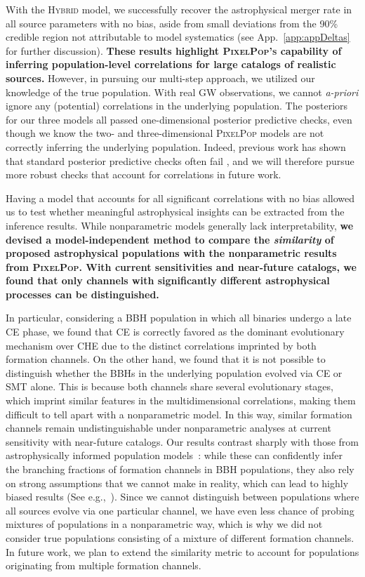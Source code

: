 \documentclass[twocolumn, twocolappendix]{aastex631}
\newcommand{\PixelPop}{\textsc{PixelPop}\xspace}
\newcommand{\Hybrid}{\textsc{Hybrid}\xspace}
\begin{document}
With the \Hybrid model, we successfully recover the astrophysical merger rate in all source parameters with no bias, aside from small deviations from the 90\% credible region not attributable to model systematics (see App.~\ref{app:appDeltas} for further discussion). \textbf{These results highlight \textsc{PixelPop's} capability of inferring population-level correlations for large catalogs of realistic sources.} However, in pursuing our multi-step approach, we utilized our knowledge of the true population. With real \ac{GW} observations, we cannot \textit{a-priori} ignore any (potential) correlations in the underlying population. The posteriors for our three models all passed one-dimensional posterior predictive checks, even though we know the two- and three-dimensional \PixelPop models are not correctly inferring the underlying population. Indeed, previous work has shown that standard posterior predictive checks often fail \citep{Romero-Shaw:2022ctb, Miller:2024sui}, and we will therefore pursue more robust checks that account for correlations in future work.

Having a model that accounts for all significant correlations with no bias allowed us to test whether meaningful astrophysical insights can be extracted from the inference results. While nonparametric models generally lack interpretability, \textbf{we devised a model-independent method to compare the \textit{similarity} of proposed astrophysical populations with the nonparametric results from \PixelPop. With current sensitivities and near-future catalogs, we found that only channels with significantly different astrophysical processes can be distinguished.}

In particular, considering a \ac{BBH} population in which all binaries undergo a late \ac{CE} phase, we found that \ac{CE} is correctly favored as the dominant evolutionary mechanism over \ac{CHE} due to the distinct correlations imprinted by both formation channels. On the other hand, we found that it is not possible to distinguish whether the \acp{BBH} in the underlying population evolved via \ac{CE} or \ac{SMT} alone. This is because both channels share several evolutionary stages, which imprint similar features in the multidimensional correlations, making them difficult to tell apart with a nonparametric model. In this way, similar formation channels remain undistinguishable under nonparametric analyses at current sensitivity with near-future catalogs. Our results contrast sharply with those from astrophysically informed population models~\citep{Zevin:2020gbd, Colloms:2025hib}: while these can confidently infer the branching fractions of formation channels in \ac{BBH} populations, they also rely on strong assumptions that we cannot make in reality, which can lead to highly biased results (See e.g.,~\citet{Cheng:2023ddt}). Since we cannot distinguish between populations where all sources evolve via one particular channel, we have even less chance of probing mixtures of populations in a nonparametric way, which is why we did not consider true populations consisting of a mixture of different formation channels. In future work, we plan to extend the similarity metric to account for populations originating from multiple formation channels.
\end{document}
